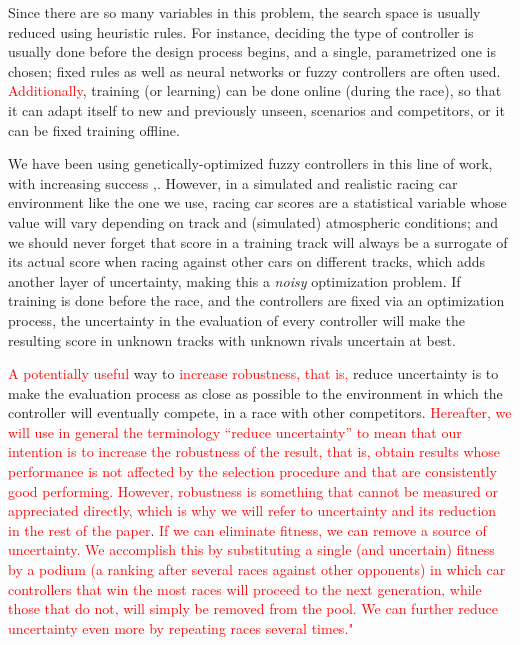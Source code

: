 \documentclass[10pt,journal,compsoc]{IEEEtran}
\begin{document}
Since there are so many variables in this problem, the search space is usually reduced using heuristic rules. For instance, deciding the type of controller is usually done before the design process begins, and a single, parametrized one
is chosen; fixed rules as well as neural networks \cite{KIM201287} or fuzzy controllers \cite{PerezEvolvingFuzzy09} are often used. \textcolor{red}{
Additionally}, training (or learning) \cite{Loiacono:2012:LEA:2212908.2212953} can be done online (during the
race), so that it can adapt itself to new and previously unseen,
scenarios and competitors, or it can be fixed training offline. 

We have been using genetically-optimized fuzzy controllers in this line of work, with increasing success \cite{salem_evo17},\cite{salem_evo18}.
However, in a simulated and realistic racing car environment like the one we use, racing car scores are a
    statistical variable whose value will vary depending on track and
    (simulated) atmospheric conditions; and we should never forget
    that score in a training track will always be a surrogate of its
    actual score when racing against other cars on different tracks,
    which adds another layer of uncertainty, making this a {\em noisy} optimization problem.
If training is done before the
    race, and the controllers are fixed via an optimization process,
    the uncertainty in the evaluation of every controller will make
    the resulting score in unknown tracks with unknown rivals
    uncertain at best.

\textcolor{red}{A potentially useful} way to \textcolor{red}{increase robustness, that
is, }reduce uncertainty is to make the evaluation process
as close as possible to the environment in which the controller will
eventually compete, in a race with other
competitors. \textcolor{red}{Hereafter, we will use in general the
  terminology ``reduce uncertainty'' to mean that our intention is to
  increase the robustness of the result, that is, obtain results whose
  performance is not affected by the selection procedure and that are
  consistently good performing. However, robustness is something that
  cannot be measured or appreciated directly, which is why we will
  refer to uncertainty and its reduction in the rest of the paper}.
\textcolor{red}{
	If we can eliminate fitness, we can remove a source of uncertainty. We accomplish this by substituting a single (and uncertain) fitness  by a podium (a ranking after several races against other opponents) 
	in which car controllers that win the most races will proceed to the next generation, while those that do not, will simply be removed from the pool. We can further reduce uncertainty even more by repeating
	races several times."}
\end{document}
